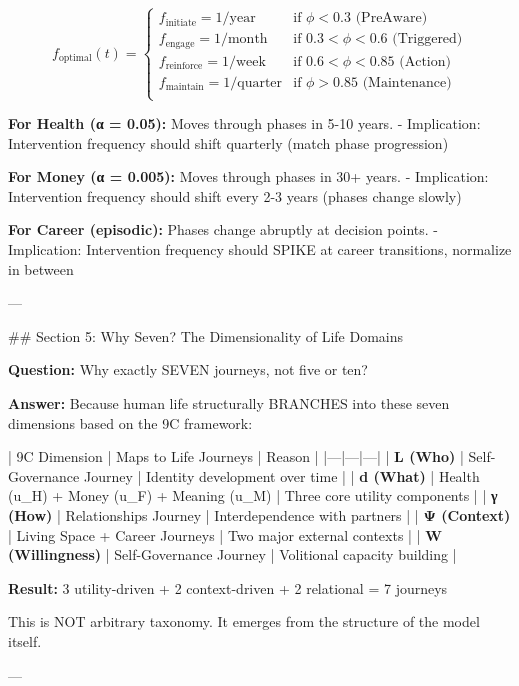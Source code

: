 \begin{equation}
f_{\text{optimal}}(t) = \begin{cases}
f_{\text{initiate}} = 1/\text{year} & \text{if } \phi < 0.3 \text{ (PreAware)} \\
f_{\text{engage}} = 1/\text{month} & \text{if } 0.3 < \phi < 0.6 \text{ (Triggered)} \\
f_{\text{reinforce}} = 1/\text{week} & \text{if } 0.6 < \phi < 0.85 \text{ (Action)} \\
f_{\text{maintain}} = 1/\text{quarter} & \text{if } \phi > 0.85 \text{ (Maintenance)} \\
\end{cases}
\end{equation}

\textbf{For Health (α = 0.05):} Moves through phases in 5-10 years.
- Implication: Intervention frequency should shift quarterly (match phase progression)

\textbf{For Money (α = 0.005):} Moves through phases in 30+ years.
- Implication: Intervention frequency should shift every 2-3 years (phases change slowly)

\textbf{For Career (episodic):} Phases change abruptly at decision points.
- Implication: Intervention frequency should SPIKE at career transitions, normalize in between

---

## Section 5: Why Seven? The Dimensionality of Life Domains

\textbf{Question:} Why exactly SEVEN journeys, not five or ten?

\textbf{Answer:} Because human life structurally BRANCHES into these seven dimensions based on the 9C framework:

| 9C Dimension | Maps to Life Journeys | Reason |
|---|---|---|
| \textbf{L (Who)} | Self-Governance Journey | Identity development over time |
| \textbf{d (What)} | Health (u_H) + Money (u_F) + Meaning (u_M) | Three core utility components |
| \textbf{γ (How)} | Relationships Journey | Interdependence with partners |
| \textbf{Ψ (Context)} | Living Space + Career Journeys | Two major external contexts |
| \textbf{W (Willingness)} | Self-Governance Journey | Volitional capacity building |

\textbf{Result:} 3 utility-driven + 2 context-driven + 2 relational = 7 journeys

This is NOT arbitrary taxonomy. It emerges from the structure of the model itself.

---

